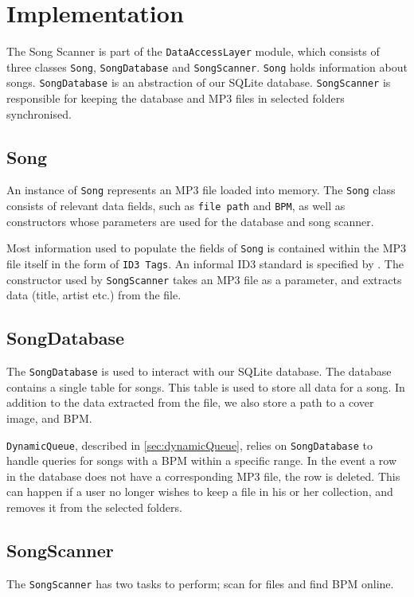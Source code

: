 \section{Implementation}
The Song Scanner is part of the \texttt{DataAccessLayer} module, which consists of three classes \texttt{Song}, \texttt{SongDatabase} and \texttt{SongScanner}. \texttt{Song} holds information about songs. \texttt{SongDatabase} is an abstraction of our SQLite database. \texttt{SongScanner} is responsible for keeping the database and MP3 files in selected folders synchronised.

\subsection{Song}
An instance of \texttt{Song} represents an MP3 file loaded into memory. The \texttt{Song} class consists of relevant data fields, such as \texttt{file path} and \texttt{BPM}, as well as constructors whose parameters are used for the database and song scanner. 

Most information used to populate the fields of \texttt{Song} is contained within the MP3 file itself in the form of \texttt{ID3 Tags}. An informal ID3 standard is specified by \citet{ID3:standard}. The constructor used by \texttt{SongScanner} takes an MP3 file as a parameter, and extracts data (title, artist etc.) from the file.

\subsection{SongDatabase}
The \texttt{SongDatabase} is used to interact with our SQLite database. The database contains a single table for songs. This table is used to store all data for a song. In addition to the data extracted from the file, we also store a path to a cover image, and BPM.

\texttt{DynamicQueue}, described in \cref{sec:dynamicQueue}, relies on \texttt{SongDatabase} to handle queries for songs with a BPM within a specific range. In the event a row in the database does not have a corresponding MP3 file, the row is deleted. This can happen if a user no longer wishes to keep a file in his or her collection, and removes it from the selected folders. 

\subsection{SongScanner} 
The \texttt{SongScanner} has two tasks to perform; scan for files and find BPM online.

